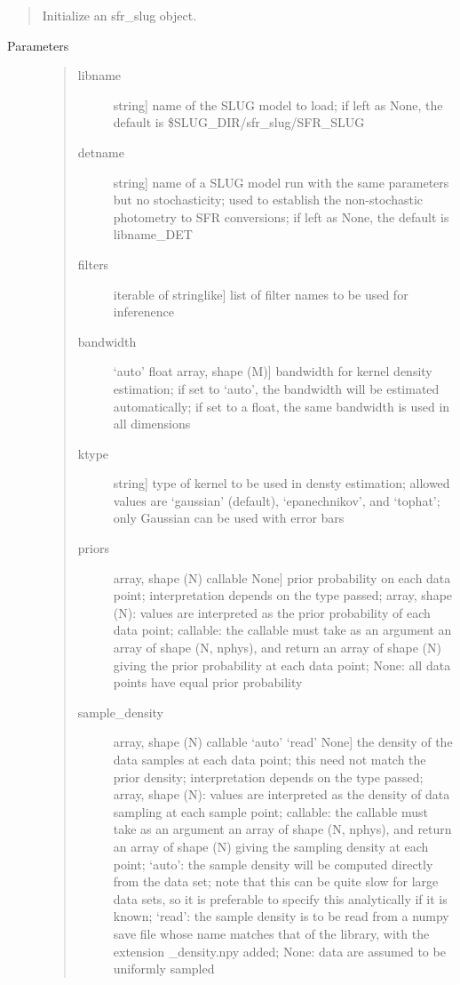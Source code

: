 \documentclass[letterpaper,10pt,english]{sphinxmanual}
\begin{document}
\begin{fulllineitems}
\begin{fulllineitems}
\begin{quote}
Initialize an sfr\_slug object.
\end{quote}
\begin{description}
\item[{Parameters}] \leavevmode\begin{quote}
\begin{description}
\item[{libname}] \leavevmode{[}string{]}
name of the SLUG model to load; if left as None, the default
is \$SLUG\_DIR/sfr\_slug/SFR\_SLUG

\item[{detname}] \leavevmode{[}string{]}
name of a SLUG model run with the same parameters but no
stochasticity; used to establish the non-stochastic
photometry to SFR conversions; if left as None, the default
is libname\_DET

\item[{filters}] \leavevmode{[}iterable of stringlike{]}
list of filter names to be used for inferenence

\item[{bandwidth}] \leavevmode{[}`auto' \textbar{} float \textbar{} array, shape (M){]}
bandwidth for kernel density estimation; if set to
`auto', the bandwidth will be estimated automatically;
if set to a float, the same bandwidth is used in all
dimensions

\item[{ktype}] \leavevmode{[}string{]}
type of kernel to be used in densty estimation; allowed
values are `gaussian' (default), `epanechnikov', and
`tophat'; only Gaussian can be used with error bars

\item[{priors}] \leavevmode{[}array, shape (N) \textbar{} callable \textbar{} None{]}
prior probability on each data point; interpretation
depends on the type passed; array, shape (N): values are
interpreted as the prior probability of each data point;
callable: the callable must take as an argument an array
of shape (N, nphys), and return an array of shape (N)
giving the prior probability at each data point; None:
all data points have equal prior probability

\item[{sample\_density}] \leavevmode{[}array, shape (N) \textbar{} callable \textbar{} `auto' \textbar{} `read' \textbar{} None{]}
the density of the data samples at each data point; this
need not match the prior density; interpretation depends
on the type passed; array, shape (N): values are
interpreted as the density of data sampling at each
sample point; callable: the callable must take as an
argument an array of shape (N, nphys), and return an
array of shape (N) giving the sampling density at each
point; `auto': the sample density will be computed
directly from the data set; note that this can be quite
slow for large data sets, so it is preferable to specify
this analytically if it is known; `read': the sample
density is to be read from a numpy save file whose name
matches that of the library, with the extension \_density.npy
added; None: data are assumed to be uniformly sampled


\end{description}
\end{quote}
\end{description}
\end{fulllineitems}
\end{fulllineitems}
\end{document}
